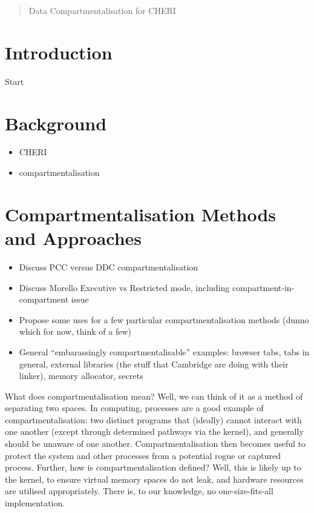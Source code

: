 \endofdump



\begin{abstract}
\noindent
Data Compartmentalisation for CHERI
\end{abstract}

\maketitle

\section{Introduction}
Start

\section{Background}
\begin{itemize}
    \item CHERI
    \item compartmentalisation
\end{itemize}

\section{Compartmentalisation Methods and Approaches}

\begin{itemize}
    \item Discuss PCC versus DDC compartmentalisation
    \item Discuss Morello Executive vs Restricted mode, including compartment-in-compartment issue
    \item Propose some uses for a few particular compartmentalisation methods (dunno which for now, think of a few)
    \item General ``embarassingly compartmentalisable'' examples: browser tabs, tabs in general, external libraries (the stuff that Cambridge are doing with their linker), memory allocator, secrets
\end{itemize}

What does compartmentalisation mean? Well, we can think of it as a method of
separating two spaces. In computing, processes are a good example of
compartmentalisation: two distinct programs that (ideally) cannot interact with
one another (except through determined pathways via the kernel), and generally
should be unaware of one another. Compartmentalisation then becomes useful to
protect the system and other processes from a potential rogue or captured
process. Further, how is compartmentalisation defined? Well, this is likely up
to the kernel, to ensure virtual memory spaces do not leak, and hardware
resources are utilised appropriately. There is, to our knowledge, no
one-size-fits-all implementation.

